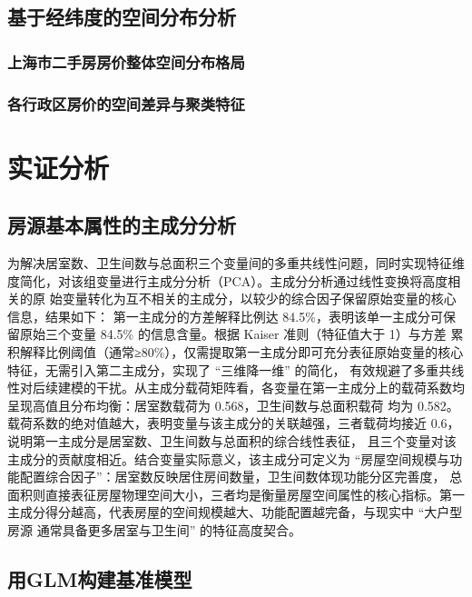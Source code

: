 \documentclass[UTF8]{ctexart}
\begin{document}
\subsection{基于经纬度的空间分布分析}

\subsubsection{上海市二手房房价整体空间分布格局}

\subsubsection{各行政区房价的空间差异与聚类特征}

\section{实证分析}

\subsection{房源基本属性的主成分分析} 

为解决居室数、卫生间数与总面积三个变量间的多重共线性问题，同时实现特征维度简化，对该组变量进行主成分分析（PCA）。主成分分析通过线性变换将高度相关的原
始变量转化为互不相关的主成分，以较少的综合因子保留原始变量的核心信息，结果如下：
第一主成分的方差解释比例达 84.5\%，表明该单一主成分可保留原始三个变量 84.5\% 的信息含量。根据 Kaiser 准则（特征值大于 1）与方差
累积解释比例阈值（通常≥80\%），仅需提取第一主成分即可充分表征原始变量的核心特征，无需引入第二主成分，实现了 “三维降一维” 的简化，
有效规避了多重共线性对后续建模的干扰。从主成分载荷矩阵看，各变量在第一主成分上的载荷系数均呈现高值且分布均衡：居室数载荷为 0.568，卫生间数与总面积载荷
均为 0.582。载荷系数的绝对值越大，表明变量与该主成分的关联越强，三者载荷均接近 0.6，说明第一主成分是居室数、卫生间数与总面积的综合线性表征，
且三个变量对该主成分的贡献度相近。结合变量实际意义，该主成分可定义为 “房屋空间规模与功能配置综合因子”：居室数反映居住房间数量，卫生间数体现功能分区完善度，
总面积则直接表征房屋物理空间大小，三者均是衡量房屋空间属性的核心指标。第一主成分得分越高，代表房屋的空间规模越大、功能配置越完备，与现实中 “大户型房源
通常具备更多居室与卫生间” 的特征高度契合。

\subsection{用GLM构建基准模型} 
\end{document}
